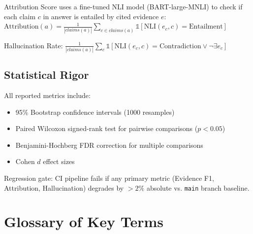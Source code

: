 Attribution Score uses a fine-tuned NLI model (BART-large-MNLI) to check if each claim $c$ in answer is entailed by cited evidence $e$:
$\text{Attribution}(a) = \frac{1}{|claims(a)|} \sum_{c \in claims(a)} \mathbb{1}[\text{NLI}(e_c, c) = \text{Entailment}]$

Hallucination Rate: $\frac{1}{|claims(a)|} \sum_c \mathbb{1}[\text{NLI}(e_c, c) = \text{Contradiction} \lor \neg \exists e_c]$

\subsection{Statistical Rigor}
\label{app:eval-stats}

All reported metrics include:
\begin{itemize}
  \item 95\% Bootstrap confidence intervals (1000 resamples)
  \item Paired Wilcoxon signed-rank test for pairwise comparisons ($p < 0.05$)
  \item Benjamini-Hochberg FDR correction for multiple comparisons
  \item Cohen $d$ effect sizes
\end{itemize}

Regression gate: CI pipeline fails if any primary metric (Evidence F1, Attribution, Hallucination) degrades by $> 2\%$ absolute vs. \texttt{main} branch baseline.


\section{Glossary of Key Terms}
\label{app:glossary}

\glsaddall
\printglossary[style=long, title=Glossary]

